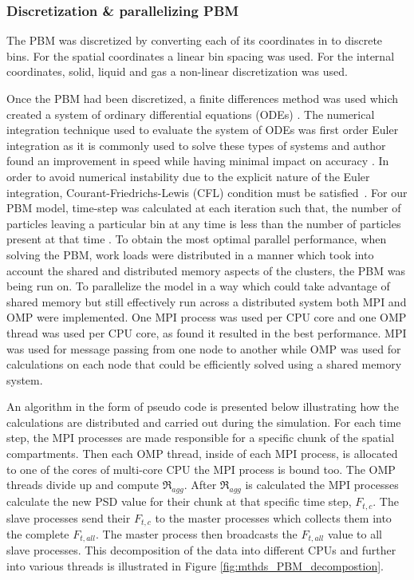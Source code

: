 \documentclass[preprint,11pt,authoryear]{elsarticle}
\begin{document}
\subsubsection{Discretization \& parallelizing PBM}
The PBM was discretized by converting each of its coordinates in to discrete bins. For the spatial 
coordinates a linear bin spacing was used. For the internal coordinates, solid, liquid and gas a 
non-linear discretization was used.

Once the PBM had been discretized, a finite differences method was 
used which created a system of ordinary differential equations (ODEs) \citep{Barrasso2015cerd}. The 
numerical integration technique used to evaluate the system of ODEs was first order Euler integration 
as it is commonly used to solve these types of systems and author found an improvement in  speed while 
having minimal impact on accuracy \citep{Barrasso2013}. In order to avoid numerical instability due to the explicit nature of the 
Euler integration, Courant-Friedrichs-Lewis (CFL) condition must be satisfied~\citep{courant1967}. For our PBM model, time-step was 
calculated at each iteration such that, the number of particles leaving a particular bin at any time is less than the number of 
particles present at that time \citep{Ramachandran2010}. To obtain the most optimal parallel 
performance, when solving the PBM, work loads were distributed in a manner which took into account 
the shared and distributed memory aspects of the clusters, the PBM was being run on. To 
parallelize the model in a way which could take advantage of shared memory but still effectively run 
across a distributed system both MPI and OMP were implemented. One MPI process was used per CPU core and one OMP 
thread was used per CPU core, as \cite{Bettencourt2017} found it resulted in the best performance. MPI was used for 
message passing from one node to another while OMP was used for calculations on each node that could be 
efficiently solved using a shared memory system. 

An algorithm in the form of pseudo code is presented below illustrating how the calculations are distributed and 
carried out 
during the simulation. For each time step, the MPI processes are made responsible for a specific chunk 
of the spatial compartments. Then each OMP thread, inside of each MPI process, is allocated to one of 
the cores of multi-core CPU the MPI process is bound too. The OMP threads divide up and 
compute $\Re_{agg}$. After $\Re_{agg}$ is calculated the MPI 
processes calculate the new PSD value for their chunk at that specific time step, $F_{t,c}$. The slave 
processes send their $F_{t,c}$ to the master processes which collects them into the complete 
$F_{t,all}$. The master process then broadcasts the $F_{t,all}$ value to all slave processes. This 
decomposition of the data into different CPUs and further into various threads is illustrated in Figure 
\ref{fig:mthds_PBM_decompostion}.	
\end{document}
